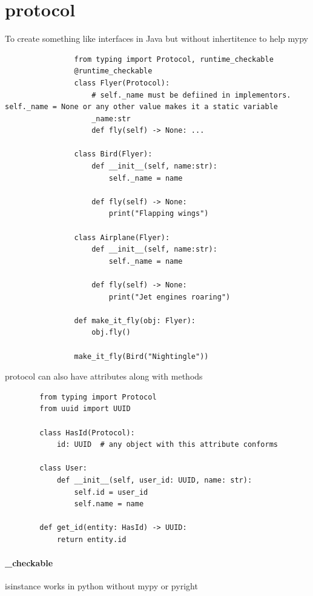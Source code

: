 \section{protocol}
    To create something like interfaces in Java but without inhertitence to help mypy
    \begin{verbatim}
                from typing import Protocol, runtime_checkable
                @runtime_checkable
                class Flyer(Protocol):
                    # self._name must be defiined in implementors. self._name = None or any other value makes it a static variable
                    _name:str
                    def fly(self) -> None: ...
    
                class Bird(Flyer):
                    def __init__(self, name:str):
                        self._name = name
                    
                    def fly(self) -> None:
                        print("Flapping wings")
                
                class Airplane(Flyer):
                    def __init__(self, name:str):
                        self._name = name
                    
                    def fly(self) -> None:
                        print("Jet engines roaring")
                
                def make_it_fly(obj: Flyer):
                    obj.fly()
                
                make_it_fly(Bird("Nightingle"))
    \end{verbatim}
    protocol can also have attributes along with methods
    \begin{verbatim}
        from typing import Protocol
        from uuid import UUID

        class HasId(Protocol):
            id: UUID  # any object with this attribute conforms

        class User:
            def __init__(self, user_id: UUID, name: str):
                self.id = user_id
                self.name = name

        def get_id(entity: HasId) -> UUID:
            return entity.id
    \end{verbatim}
    \paragraph{\@runtime\_checkable}
        isinstance works in python without mypy or pyright

